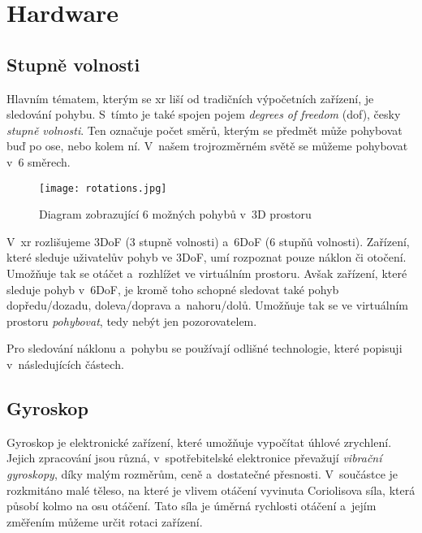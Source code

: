 \chapter{Hardware}

\section{Stupně volnosti}

Hlavním tématem, kterým se \gls{xr} liší od tradičních výpočetních zařízení, je sledování pohybu. S~tímto je také spojen pojem \textit{degrees of freedom} (\gls{dof}), česky \textit{stupně volnosti}. Ten označuje počet směrů, kterým se předmět může pohybovat \poml buď po ose, nebo kolem ní. V~našem trojrozměrném světě se můžeme pohybovat v~6 směrech. \cite{mechatech_3dof_6dof}

\begin{figure}[H]
    \centering
    \texttt{[image: rotations.jpg]}
    \caption{Diagram zobrazující 6 možných pohybů v~3D prostoru \cite{nasa_aircraft}}
    \label{rotations_nasa_fig}
\end{figure}

V~\gls{xr} rozlišujeme 3DoF (3 stupně volnosti) a~6DoF (6 stupňů volnosti). Zařízení, které sleduje uživatelův pohyb ve 3DoF, umí rozpoznat pouze náklon či otočení. Umožňuje tak se otáčet a~rozhlížet ve virtuálním prostoru. Avšak zařízení, které sleduje pohyb v~6DoF, je kromě toho schopné sledovat také pohyb dopředu/dozadu, doleva/doprava a~nahoru/dolů. Umožňuje tak se ve virtuálním prostoru \textit{pohybovat}, tedy nebýt jen pozorovatelem. \cite{mechatech_3dof_6dof}

Pro sledování náklonu a~pohybu se používají odlišné technologie, které popisuji v~následujících částech.

\section{Gyroskop}

Gyroskop je elektronické zařízení, které umožňuje vypočítat úhlové zrychlení. Jejich zpracování jsou různá, v~spotřebitelské elektronice převažují \textit{vibrační gyroskopy}, díky malým rozměrům, ceně a~dostatečné přesnosti. V~součástce je rozkmitáno malé těleso, na které je vlivem otáčení vyvinuta Coriolisova síla, která působí kolmo na osu otáčení. Tato síla je úměrná rychlosti otáčení a~jejím změřením můžeme určit rotaci zařízení. \cite{Electricity_Magnetism} \cite{techmania_coriolis}

